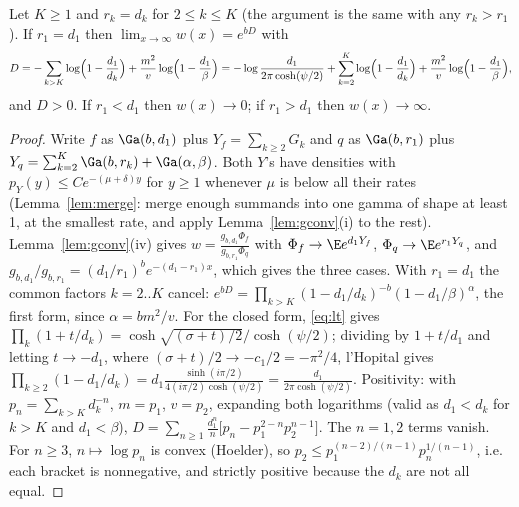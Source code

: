 \begin{lemma}\label{lem:D}
Let $K\ge1$ and $r_k=d_k$ for $2\le k\le K$ (the argument is the same with any $r_k>r_1$). If $r_1=d_1$ then
$\lim_{x\to\infty}w(x)=e^{bD}$ with
\begin{equation}\label{eq:D}
D=-\sum_{k>K}\log\Bigl(1-\frac{d_1}{d_k}\Bigr)+\frac{m^2}{v}\log\Bigl(1-\frac{d_1}{\beta}\Bigr)
=-\log\frac{d_1}{2\pi\cosh(\psi/2)}+\sum_{k=2}^K\log\Bigl(1-\frac{d_1}{d_k}\Bigr)+\frac{m^2}v\log\Bigl(1-\frac{d_1}\beta\Bigr),
\end{equation}
and $D>0$. If $r_1<d_1$ then $w(x)\to0$; if $r_1>d_1$ then $w(x)\to\infty$.
\end{lemma}
\begin{proof}
Write $f$ as $\Ga(b,d_1)$ plus $Y_f=\sum_{k\ge2}G_k$ and $q$ as $\Ga(b,r_1)$ plus $Y_q=\sum_{k=2}^K\Ga(b,r_k)+
\Ga(\alpha,\beta)$. Both $Y$'s have densities with $p_Y(y)\le Ce^{-(\mu+\delta)y}$ for $y\ge1$ whenever $\mu$ is
below all their rates (Lemma~\ref{lem:merge}: merge enough summands into one gamma of shape at least 1, at the
smallest rate, and apply Lemma~\ref{lem:gconv}(i) to the rest). Lemma~\ref{lem:gconv}(iv) gives
$w=\frac{g_{b,d_1}\Phi_f}{g_{b,r_1}\Phi_q}$ with $\Phi_f\to\E e^{d_1Y_f}$, $\Phi_q\to\E e^{r_1Y_q}$, and
$g_{b,d_1}/g_{b,r_1}=(d_1/r_1)^be^{-(d_1-r_1)x}$, which gives the three cases. With $r_1=d_1$ the common factors
$k=2..K$ cancel: $e^{bD}=\prod_{k>K}(1-d_1/d_k)^{-b}(1-d_1/\beta)^{\alpha}$, the first form, since
$\alpha=bm^2/v$. For the closed form, \eqref{eq:lt} gives $\prod_k(1+t/d_k)=\cosh\sqrt{(\sigma+t)/2}/\cosh(\psi/2)$;
dividing by $1+t/d_1$ and letting $t\to-d_1$, where $(\sigma+t)/2\to-c_1/2=-\pi^2/4$, l'Hopital gives
$\prod_{k\ge2}(1-d_1/d_k)=d_1\frac{\sinh(i\pi/2)}{4(i\pi/2)\cosh(\psi/2)}=\frac{d_1}{2\pi\cosh(\psi/2)}$.
Positivity: with $p_n=\sum_{k>K}d_k^{-n}$, $m=p_1$, $v=p_2$, expanding both logarithms (valid as $d_1<d_k$ for
$k>K$ and $d_1<\beta$),
$D=\sum_{n\ge1}\frac{d_1^n}{n}\bigl[p_n-p_1^{2-n}p_2^{n-1}\bigr]$. The $n=1,2$ terms vanish. For $n\ge3$,
$n\mapsto\log p_n$ is convex (Hoelder), so $p_2\le p_1^{(n-2)/(n-1)}p_n^{1/(n-1)}$, i.e. each bracket is
nonnegative, and strictly positive because the $d_k$ are not all equal.
\end{proof}

